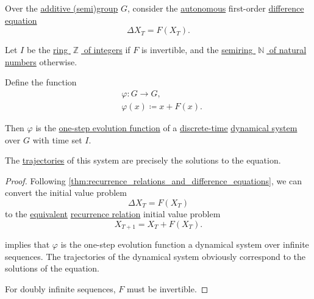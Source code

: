 \begin{proposition}\label{thm:autonomous_difference_equation_as_dynamical_system}
  Over the \hyperref[def:additive_semigroup]{additive (semi)group} \( G \), consider the \hyperref[def:difference_equation/autonomous]{autonomous} first-order \hyperref[def:difference_equation]{difference equation}
  \begin{equation*}
    \Delta X_T = F(X_T).
  \end{equation*}

  Let \( I \) be the \hyperref[def:integers]{ring \( \BbbZ \) of integers} if \( F \) is invertible, and the \hyperref[def:natural_numbers]{semiring \( \BbbN \) of natural numbers} otherwise.

  Define the function
  \begin{equation*}
    \begin{aligned}
      &\varphi: G \to G, \\
      &\varphi(x) \coloneqq x + F(x).
    \end{aligned}
  \end{equation*}

  Then \( \varphi \) is the \hyperref[def:one_step_evolution_function]{one-step evolution function} of a \hyperref[def:discrete_dynamical_system]{discrete-time} \hyperref[def:dynamical_system]{dynamical system} over \( G \) with time set \( I \).

  The \hyperref[def:dynamical_system_trajectory]{trajectories} of this system are precisely the solutions to the equation.
\end{proposition}
\begin{proof}
  Following \cref{thm:recurrence_relations_and_difference_equations}, we can convert the initial value problem
  \begin{equation*}
    \Delta X_T = F(X_T)
  \end{equation*}
  to the \hyperref[con:equivalent_systems_of_equations]{equivalent} \hyperref[def:recurrence_relation]{recurrence relation} initial value problem
  \begin{equation*}
    X_{T+1} = X_T + F(X_T).
  \end{equation*}

   implies that \( \varphi \) is the one-step evolution function a dynamical system over infinite sequences. The trajectories of the dynamical system obviously correspond to the solutions of the equation.

  For doubly infinite sequences, \( F \) must be invertible.
\end{proof}

